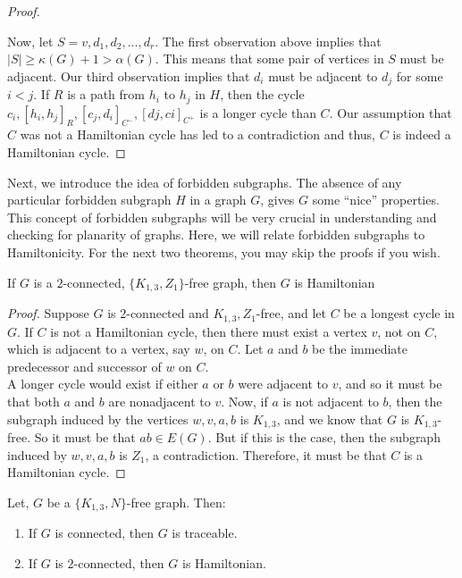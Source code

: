 \documentclass[../basic_graph_theory.tex]{subfiles}
\begin{document}
\begin{proof}
\begin{enumerate}
    \end{enumerate}
    Now, let $S = {v,d_1, d_2,...,d_r}$. The first observation above implies that $|S| \ge \kappa(G)+1 > \alpha(G)$. This means that some pair of vertices in $S$ must be adjacent. Our third observation implies that $d_i$ must be adjacent to $d_j$ for some $i<j$. If $R$ is a path from $h_i$ to $h_j$ in $H$, then the cycle $c_i, [h_i, h_j]_{R}, [c_j , d_i]_{C^-} , [dj , ci]_{C^+}$ is a longer cycle than $C$. Our assumption that $C$ was not a Hamiltonian cycle has led to a contradiction and thus, $C$ is indeed a Hamiltonian cycle.
\end{proof}

Next, we introduce the idea of forbidden subgraphs. The absence of any particular forbidden subgraph $H$ in a graph $G$, gives $G$ some ``nice'' properties. This concept of forbidden subgraphs will be very crucial in understanding and checking for planarity of graphs. Here, we will relate forbidden subgraphs to Hamiltonicity. For the next two theorems, you may skip the proofs if you wish.

\begin{Thm}{}{}
    If $G$ is a $2$-connected, $\{K_{1,3}, Z_{1}\}$-free graph, then $G$ is Hamiltonian
\end{Thm}
\begin{proof}
    Suppose $G$ is $2$-connected and ${K_{1,3}, Z_1}$-free, and let $C$ be a longest cycle in $G$. If $C$ is not a Hamiltonian cycle, then there must exist a vertex $v$, not on $C$, which is adjacent to a vertex, say $w$, on $C$. Let $a$ and $b$ be the immediate predecessor and successor of $w$ on $C$.\\
    A longer cycle would exist if either $a$ or $b$ were adjacent to $v$, and so it must be that both $a$ and $b$ are nonadjacent to $v$. Now, if $a$ is not adjacent to $b$, then the subgraph induced by the vertices ${w,v,a,b}$ is $K_{1,3}$, and we know that $G$ is $K_{1,3}$-free. So it must be that $ab \in E(G)$. But if this is the case, then the subgraph induced by ${w,v,a,b}$ is $Z_1$, a contradiction. Therefore, it must be that $C$ is a Hamiltonian cycle.
\end{proof}

\begin{Thm}{}{}
    \label{ref:1}
    Let, $G$ be a $\{K_{1,3}, N\}$-free graph. Then:\\
    \begin{enumerate}
        \item If $G$ is connected, then $G$ is traceable.
        \item If $G$ is $2$-connected, then $G$ is Hamiltonian.
    \end{enumerate}
\end{Thm}
\end{document}

